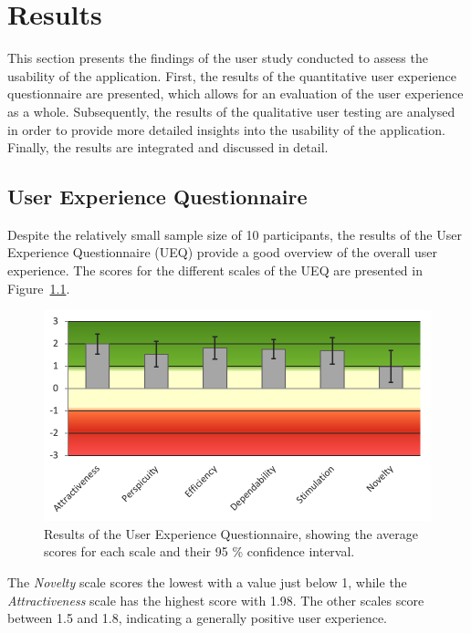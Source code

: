 %
\chapter{Results}
\label{sec:result}

This section presents the findings of the user study conducted to assess the usability of the application.
First, the results of the quantitative user experience questionnaire are presented, which allows for an evaluation of the user experience as a whole.
Subsequently, the results of the qualitative user testing are analysed in order to provide more detailed insights into the usability of the application.
Finally, the results are integrated and discussed in detail.

\section{User Experience Questionnaire}
\label{sec:result:ux}

Despite the relatively small sample size of 10 participants, the results of the User Experience Questionnaire (UEQ) provide a good overview of the overall user experience.
The scores for the different scales of the UEQ are presented in Figure~\ref{fig:ueq-1}. 

\begin{figure}[htb]
  \centering
	\includegraphics[width=.9\textwidth]{figures/ueq-1.png}
	\caption{Results of the User Experience Questionnaire, showing the average scores for each scale and their 95 \% confidence interval.}
  \label{fig:ueq-1}
\end{figure}

The \emph{Novelty} scale scores the lowest with a value just below 1, while the \emph{Attractiveness} scale has the highest score with 1.98.
The other scales score between 1.5 and 1.8, indicating a generally positive user experience.

